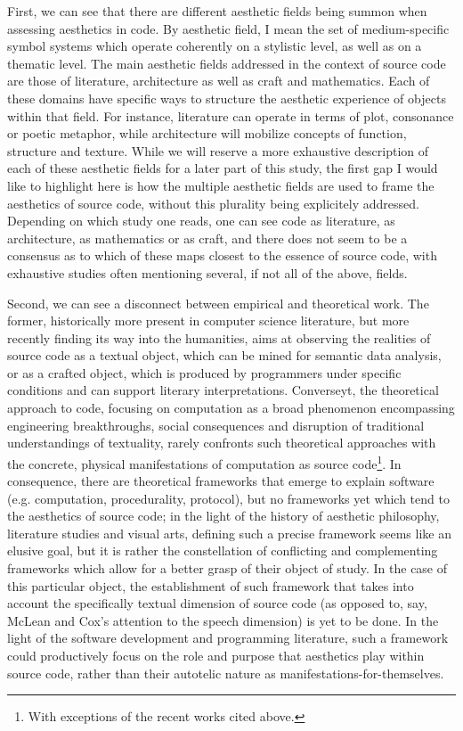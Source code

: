 First, we can see that there are different aesthetic fields being summon when assessing aesthetics in code. By aesthetic field, I mean the set of medium-specific symbol systems which operate coherently on a stylistic level, as well as on a thematic level. The main aesthetic fields addressed in the context of source code are those of literature, architecture as well as craft and mathematics. Each of these domains have specific ways to structure the aesthetic experience of objects within that field. For instance, literature can operate in terms of plot, consonance or poetic metaphor, while architecture will mobilize concepts of function, structure and texture. While we will reserve a more exhaustive description of each of these aesthetic fields for a later part of this study, the first gap I would like to highlight here is how the multiple aesthetic fields are used to frame the aesthetics of source code, without this plurality being explicitely addressed. Depending on which study one reads, one can see code as literature, as architecture, as mathematics or as craft, and there does not seem to be a consensus as to which of these maps closest to the essence of source code, with exhaustive studies often mentioning several, if not all of the above, fields\cite{rapaport_philosophy_2005}.

Second, we can see a disconnect between empirical and theoretical work. The former, historically more present in computer science literature, but more recently finding its way into the humanities, aims at observing the realities of source code as a textual object, which can be mined for semantic data analysis, or as a crafted object, which is produced by programmers under specific conditions and can support literary interpretations. Converseyt, the theoretical approach to code, focusing on computation as a broad phenomenon encompassing engineering breakthroughs, social consequences and disruption of traditional understandings of textuality, rarely confronts such theoretical approaches with the concrete, physical manifestations of computation as source code\footnote{With exceptions of the recent works cited above.}.
In consequence, there are theoretical frameworks that emerge to explain software (e.g. computation, procedurality, protocol), but no frameworks yet which tend to the aesthetics of source code; in the light of the history of aesthetic philosophy, literature studies and visual arts, defining such a precise framework seems like an elusive goal, but it is rather the constellation of conflicting and complementing frameworks which allow for a better grasp of their object of study. In the case of this particular object, the establishment of such framework that takes into account the specifically textual dimension of source code (as opposed to, say, McLean and Cox's attention to the speech dimension) is yet to be done. In the light of the software development and programming literature, such a framework could productively focus on the role and purpose that aesthetics play within source code, rather than their autotelic nature as manifestations-for-themselves.

